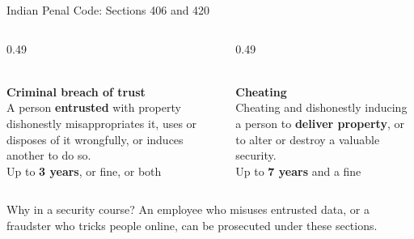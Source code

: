 \documentclass[aspectratio=169,11pt,xcolor={table}]{beamer}
\begin{document}
\begin{frame}{Indian Penal Code: Sections 406 and 420}
  \begin{columns}[T]
    \begin{column}{0.49\textwidth}
      \centering
      \\[1mm]
      \textbf{\textcolor{grape}{Criminal breach of trust}}\\[1mm]
      {\small A person \textbf{entrusted} with property dishonestly misappropriates it, uses or disposes of it wrongfully, or induces another to do so.}\\[2mm]
      \colorbox{grape!15}{\small Up to \textbf{3 years}, or fine, or both}
    \end{column}
    \begin{column}{0.49\textwidth}
      \centering
      \\[1mm]
      \textbf{\textcolor{brick}{Cheating}}\\[1mm]
      {\small Cheating and dishonestly inducing a person to \textbf{deliver property}, or to alter or destroy a valuable security.}\\[2mm]
      \colorbox{brick!15}{\small Up to \textbf{7 years} and a fine}
    \end{column}
  \end{columns}
  \vspace{4mm}
  \begin{block}{Why in a security course?}
    \small An employee who misuses entrusted data, or a fraudster who tricks people online, can be prosecuted under these sections.
  \end{block}
\end{frame}
\end{document}

